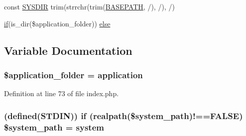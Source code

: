 \begin{DoxyCompactItemize}
\item 
const \hyperlink{vendors_2tinymce_2plugins_2jbimages_2ci_2index_8php_ab645ae0961792b1f2b4b83f89cb95fa5}{S\+Y\+S\+D\+IR} trim(strrchr(trim(\hyperlink{vendors_2tinymce_2plugins_2jbimages_2ci_2index_8php_ad39801cabfd338dc5524466fe793fda9}{B\+A\+S\+E\+P\+A\+TH}, \textquotesingle{}/\textquotesingle{}), \textquotesingle{}/\textquotesingle{}), \textquotesingle{}/\textquotesingle{})
\item 
\hyperlink{jquery_8tokeninput_8js_ad8dd46a3cbc004569e34401e9e71771a}{if}(is\+\_\+dir(\$application\+\_\+folder)) \hyperlink{vendors_2tinymce_2plugins_2jbimages_2ci_2index_8php_a949e0a4a1cdea0279f54348f205f993b}{else}
\end{DoxyCompactItemize}


\subsection{Variable Documentation}
\subsubsection[{\texorpdfstring{\$application\+\_\+folder}{$application_folder}}]{\setlength{\rightskip}{0pt plus 5cm}\$application\+\_\+folder = \textquotesingle{}application\textquotesingle{}}\hypertarget{vendors_2tinymce_2plugins_2jbimages_2ci_2index_8php_ace4309eda0b92e3260b226079bc17909}{}\label{vendors_2tinymce_2plugins_2jbimages_2ci_2index_8php_ace4309eda0b92e3260b226079bc17909}


Definition at line 73 of file index.\+php.

\subsubsection[{\texorpdfstring{\$system\+\_\+path}{$system_path}}]{ (defined(\textquotesingle{}S\+T\+D\+IN\textquotesingle{})) {\bf if} (realpath(\$system\+\_\+path)!==F\+A\+L\+SE) \$system\+\_\+path = \textquotesingle{}system\textquotesingle{}}\hypertarget{vendors_2tinymce_2plugins_2jbimages_2ci_2index_8php_ae873e5430c828eb3081abe7050a379b6}{}\label{vendors_2tinymce_2plugins_2jbimages_2ci_2index_8php_ae873e5430c828eb3081abe7050a379b6}


